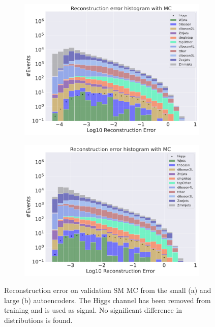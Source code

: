 \begin{figure}[H]
    \centering
    \begin{subfigure}{.45\textwidth}
        \includegraphics[width=\textwidth]{Figures/AE_testing/small/b_data_recon_big_rm3_feats_sig_higgs.pdf}
        \caption{}
        \label{fig:ae_small_higgs}
    \end{subfigure}
    \hfill 
    \begin{subfigure}{.45\textwidth}
        \includegraphics[width=\textwidth]{Figures/AE_testing/big/b_data_recon_big_rm3_feats_sig_higgs.pdf}
        \caption{ }
        \label{fig:ae_big_higgs}
    \end{subfigure}
    \hfill 
    \caption[AE | Reconstruction error using Higgs channel as signal]{Reconstruction error on validation SM MC from the small (a) and large (b) autoencoders. The Higgs channel has been removed from training and 
    is used as signal. No significant difference in distributions is found.  } 
    \label{fig:ae_big_channel_1}
    
\end{figure}

